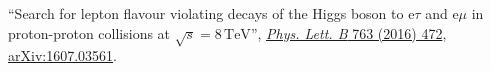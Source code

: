 \begin{description}[leftmargin=12pt,font=\normalfont\textit]
\begin{description}[leftmargin=12pt,font=\normalfont,labelsep=0em]
\item ``Search for lepton flavour violating decays of the Higgs boson to e$\tau$ and e$\mu$ in proton-proton collisions at $\sqrt{s} = 8\,\text{TeV}$'', \href{http://dx.doi.org/10.1016/j.physletb.2016.09.062}{\emph{Phys. Lett. B} 763 (2016) 472}, \href{http://arxiv.org/abs/1607.03561}{arXiv:1607.03561}.
\end{description}
\end{description}